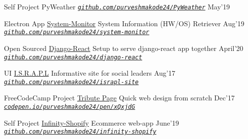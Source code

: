\begin{cventries}
  \vspace{0.5mm} %
    
  \cventry
  {Self Project}
  {PyWeather}
   {\emph{\texttt{\href{https://github.com/purveshmakode24/PyWeather}{github.com/purveshmakode24/PyWeather}}}}
  {May'19}
  {
    \begin{cvitems}
        \vspace{1mm}
    \end{cvitems}
  }
  
  \vspace{0.5mm} %
 
  \smallcventry
  {Electron App}
  {\href{https://github.com/purveshmakode24/django-react}{System-Monitor}}
  {System Information (HW/OS) Retriever}
  {Aug'19}
  {\emph{\texttt{\href{https://github.com/purveshmakode24/system-monitor}{github.com/purveshmakode24/system-monitor}}}}
  
  \vspace{0.5mm} 
   
  \smallcventry
  {Open Sourced}
  {\href{https://github.com/purveshmakode24/django-react}{Django-React}}
  {Setup to serve django-react app together}
  {April'20}
  {\emph{\texttt{\href{https://github.com/purveshmakode24/django-react}{github.com/purveshmakode24/django-react}}}}
  
  \vspace{0.5mm}
  
  \smallcventry
  {UI}
  {\href{https://github.com/PurveshMakode24/israpl-site}{I.S.R.A.P.L}}
  {Informative site for social leaders}
  {Aug'17}
  {\emph{\texttt{\href{https://github.com/purveshmakode24/israpl-site}{github.com/purveshmakode24/israpl-site}}}}
    
  \vspace{0.5mm} 

  \smallcventry
  {FreeCodeCamp Project}
  {\href{https://codepen.io/purveshmakode24/pen/xQxjdG}{Tribute Page}}
  {Quick web design from scratch}
  {Dec'17}
  {\emph{\texttt{\href{https://codepen.io/purveshmakode24/pen/xQxjdG}{codepen.io/purveshmakode24/pen/xQxjdG}}}}
  
  \vspace{0.5mm} 
   
  \smallcventry
  {Self Project}
  {\href{https://github.com/purveshmakode24/infinity-shopify}{Infinity-Shopify}}
  {Ecommerce web-app}
  {June'19}
  {\emph{\texttt{\href{https://github.com/purveshmakode24/infinity-shopify}{github.com/purveshmakode24/infinity-shopify}}}}
  
\end{cventries}
\vspace{-2mm}

